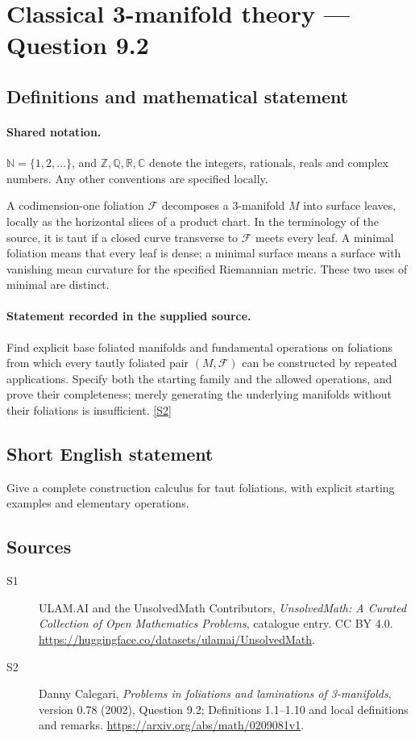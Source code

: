 \documentclass[11pt]{article}
\newcommand{\sref}[2]{\hyperlink{source:#1:#2}{[S#2]}}
\begin{document}
\section{Classical 3-manifold theory — Question 9.2}\label{statement}

\subsection{Definitions and mathematical statement}

\paragraph{Shared notation.}$\mathbb N=\{1,2,\ldots\}$, and $\mathbb Z,\mathbb Q,\mathbb R,\mathbb C$ denote the integers, rationals, reals and complex numbers. Any other conventions are specified locally.


A codimension-one foliation $\mathcal F$ decomposes a $3$-manifold $M$ into surface leaves, locally as the horizontal slices of a product chart. In the terminology of the source, it is taut if a closed curve transverse to $\mathcal F$ meets every leaf. A minimal foliation means that every leaf is dense; a minimal surface means a surface with vanishing mean curvature for the specified Riemannian metric. These two uses of minimal are distinct.
\paragraph{Statement recorded in the supplied source.}
Find explicit base foliated manifolds and fundamental operations on foliations from which every tautly foliated pair $(M,\mathcal F)$ can be constructed by repeated applications. Specify both the starting family and the allowed operations, and prove their completeness; merely generating the underlying manifolds without their foliations is insufficient. \sref{statement}{2}
\subsection{Short English statement}
Give a complete construction calculus for taut foliations, with explicit starting examples and elementary operations.
\subsection{Sources}
\begin{description}
\item[\hypertarget{source:statement:1}{S1}] ULAM.AI and the UnsolvedMath Contributors, \emph{UnsolvedMath: A Curated Collection of Open Mathematics Problems}, catalogue entry. CC BY 4.0. \url{https://huggingface.co/datasets/ulamai/UnsolvedMath}.
\item[\hypertarget{source:statement:2}{S2}] Danny Calegari, \emph{Problems in foliations and laminations of 3-manifolds}, version 0.78 (2002), Question 9.2; Definitions 1.1--1.10 and local definitions and remarks. \url{https://arxiv.org/abs/math/0209081v1}.
\end{description}
\label{end:statement}
\end{document}
